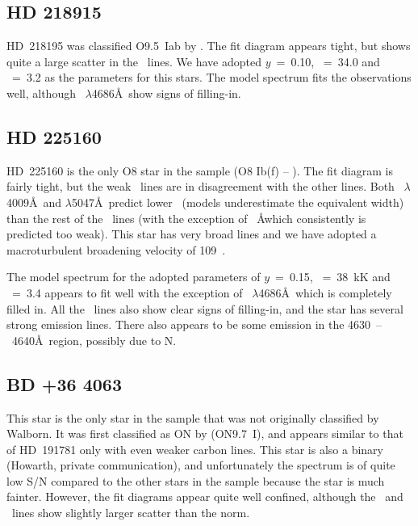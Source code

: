 \subsection{HD 218915}  %
\label{analysis:hd218915}

HD~218195 was classified O9.5~Iab by . The fit diagram
appears tight, but shows quite a large scatter in the \heii\ lines. We
have adopted $y$~=~0.10, \teff~=~34.0 and \logg~=~3.2 as the
parameters for this stars. The model spectrum fits the observations
well, although \heii~$\lambda$4686\AA\ show signs of filling-in. 

\subsection{HD 225160}  %
\label{analysis:hd225160}

HD~225160 is the only O8 star in the sample (O8 Ib(f) --
\cite{wa:76}). The fit diagram is fairly tight, but the weak \hei\
lines are in disagreement with the other lines. Both
\hei~$\lambda$4009\AA\ and $\lambda$5047\AA\ predict lower \teff\
(models underestimate the equivalent width) than the rest of the
\hei\ lines (with the exception of \hei\ \lam4471\AA which
consistently is predicted too weak). This star has very broad lines
and we have adopted a macroturbulent broadening velocity of 109~\kms.

The model spectrum for the adopted parameters of $y$~=~0.15,
\teff~=~38~kK and \logg~=~3.4 appears to fit well with the exception of
\heii~$\lambda$4686\AA\ which is completely filled in. All the \hi\
lines also show clear signs of filling-in, and the star has several
strong emission lines. There also appears to be some emission in the
4630~--~4640\AA\ region, possibly due to N\scr{3}.

\subsection{BD +36 4063}  %
\label{analysis:bd+364063}

This star is the only star in the sample that was not originally
classified by Walborn. It was first classified as ON by 
(ON9.7~I), and appears similar to that of HD~191781 only with even
weaker carbon lines. This star is also a binary (Howarth, private
communication), and unfortunately the spectrum is of quite low S/N
compared to the other stars in the sample because the star is much
fainter. However, the fit diagrams appear quite well confined,
although the \heii\ and \hi\ lines show slightly larger scatter than
the norm.

